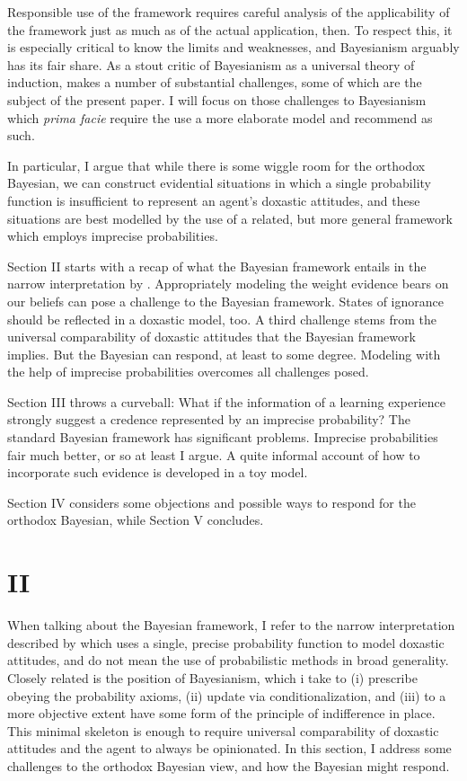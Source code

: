 \documentclass[11pt, a4paper]{scrartcl}
\begin{document}
Responsible use of the framework requires careful analysis of the applicability of the framework just as much as of the actual application, then. To respect this, it is especially critical to know the limits and weaknesses, and Bayesianism arguably has its fair share. As a stout critic of Bayesianism as a universal theory of induction, \citet{Norton2011-NORCTB} makes a number of substantial challenges, some of which are the subject of the present paper. I will focus on those challenges to Bayesianism which \emph{prima facie} require the use a more elaborate model and recommend as such.

In particular, I argue that while there is some wiggle room for the orthodox Bayesian, we can construct evidential situations in which a single probability function is insufficient to represent an agent's doxastic attitudes, and these situations are best modelled by the use of a related, but more general framework which employs imprecise probabilities.

Section II starts with a recap of what the Bayesian framework entails in the narrow interpretation by \citep{Norton2011-NORCTB}. Appropriately modeling the weight evidence bears on our beliefs can pose a challenge to the Bayesian framework. States of ignorance should be reflected in a doxastic model, too. A third challenge stems from the universal comparability of doxastic attitudes that the Bayesian framework implies. But the Bayesian can respond, at least to some degree. Modeling with the help of imprecise probabilities overcomes all challenges posed.

Section III throws a curveball: What if the information of a learning experience strongly suggest a credence represented by an imprecise probability? The standard Bayesian framework has significant problems. Imprecise probabilities fair much better, or so at least I argue. A quite informal account of how to incorporate such evidence is developed in a toy model.

Section IV considers some objections and possible ways to respond for the orthodox Bayesian, while Section V concludes.

\section{II}

When talking about the Bayesian framework, I refer to the narrow interpretation described by \citet{Norton2011-NORCTB} which uses a single, precise probability function to model doxastic attitudes, and do not mean the use of probabilistic methods in broad generality. Closely related is the position of Bayesianism, which i take to (i) prescribe obeying the probability axioms, (ii) update via conditionalization, and (iii) to a more objective extent have some form of the principle of indifference in place. This minimal skeleton is enough to require universal comparability of doxastic attitudes and the agent to always be opinionated. In this section, I address some challenges to the orthodox Bayesian view, and how the Bayesian might respond. 
\end{document}
